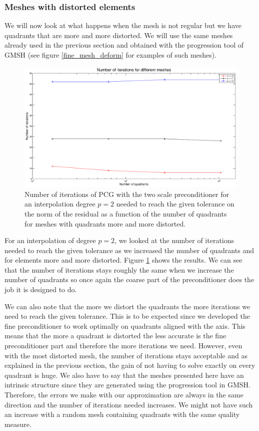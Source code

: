 \subsubsection{Meshes with distorted elements}

We will now look at what happens when the mesh is not regular but we have quadrants that are more and more distorted. We will use the same meshes already used in the previous section and obtained with the progression tool of GMSH (see figure \ref{fine_mesh_deform} for examples of such meshes).

\begin{figure}
\centering
\includegraphics[scale=0.35]{Results/two_irreg_iter.eps}
\caption{Number of iterations of PCG with the two scale preconditioner for an interpolation degree $p=2$ needed to reach the given tolerance on the norm of the residual as a function of the number of quadrants for meshes with quadrants more and more distorted.}
\label{two_irreg_iter}
\end{figure}

For an interpolation of degree $p=2$, we looked at the number of iterations needed to reach the given tolerance as we increased the number of quadrants and for elements more and more distorted. Figure \ref{two_irreg_iter} shows the results. We can see that the number of iterations stays roughly the same when we increase the number of quadrants so once again the coarse part of the preconditioner does the job it is designed to do. 

We can also note that the more we distort the quadrants the more iterations we need to reach the given tolerance. This is to be expected since we developed the fine preconditioner to work optimally on quadrants aligned with the axis. This means that the more a quadrant is distorted the less accurate is the fine preconditioner part and therefore the more iterations we need. However, even with the most distorted mesh, the number of iterations stays acceptable and as explained in the previous section, the gain of not having to solve exactly on every quadrant is huge. We also have to say that the meshes presented here have an intrinsic structure since they are generated using the progression tool in GMSH. Therefore, the errors we make with our approximation are always in the same direction and the number of iterations needed increases. We might not have such an increase with a random mesh containing quadrants with the same quality measure. 


